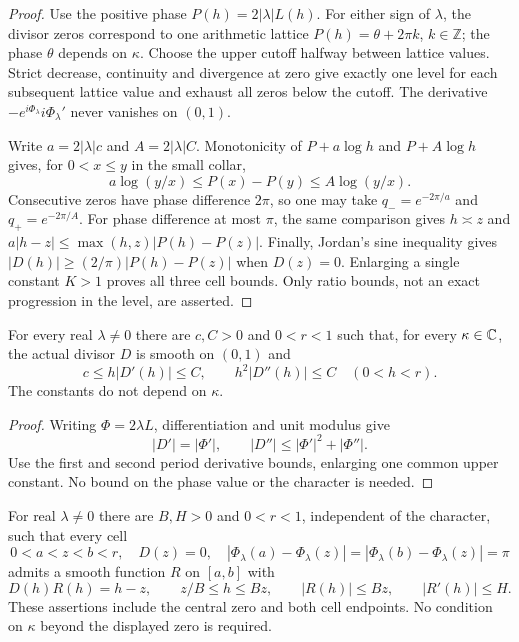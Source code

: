 \begin{proof}
\leanok
Use the positive phase $P(h)=2|\lambda|L(h)$. For either sign of $\lambda$,
the divisor zeros correspond to one arithmetic lattice
$P(h)=\theta+2\pi k$, $k\in\mathbb Z$; the phase $\theta$ depends on $\kappa$.
Choose the upper cutoff halfway between lattice values. Strict decrease,
continuity and divergence at zero give exactly one level for each subsequent
lattice value and exhaust all zeros below the cutoff. The derivative
$-e^{i\Phi_\lambda}i\Phi_\lambda'$ never vanishes on $(0,1)$.

Write $a=2|\lambda|c$ and $A=2|\lambda|C$. Monotonicity of
$P+a\log h$ and $P+A\log h$ gives, for $0<x\le y$ in the small collar,
\[
 a\log(y/x)\le P(x)-P(y)\le A\log(y/x).
\]
Consecutive zeros have phase difference $2\pi$, so one may take
$q_-=e^{-2\pi/a}$ and $q_+=e^{-2\pi/A}$.
For phase difference at most $\pi$, the same comparison gives
$h\asymp z$ and
$a|h-z|\le \max(h,z)|P(h)-P(z)|$.
Finally, Jordan's sine inequality gives
$|D(h)|\ge(2/\pi)|P(h)-P(z)|$ when $D(z)=0$.
Enlarging a single constant $K>1$ proves all three cell bounds.
Only ratio bounds, not an exact progression in the level, are asserted.
\end{proof}

\begin{lemma}
\label{lem:quarter-divisor-derivatives}
\leanok
For every real $\lambda\ne0$ there are $c,C>0$ and $0<r<1$ such that,
for every $\kappa\in\mathbb{C}$, the actual divisor $D$ is smooth on $(0,1)$ and
\[
 c\le h|D'(h)|\le C,\qquad h^2|D''(h)|\le C
 \quad(0<h<r).
\]
The constants do not depend on $\kappa$.
\end{lemma}

\begin{proof}
\leanok
Writing $\Phi=2\lambda L$, differentiation and unit modulus give
\[
 |D'|=|\Phi'|,\qquad |D''|\le|\Phi'|^2+|\Phi''|.
\]
Use the first and second period derivative bounds, enlarging one common
upper constant. No bound on the phase value or the character is needed.
\end{proof}

\begin{lemma}
\label{lem:quarter-divisor-inverse-factor}
\leanok
For real $\lambda\ne0$ there are $B,H>0$ and $0<r<1$, independent of
the character, such that every cell
\[
 0<a<z<b<r,\quad D(z)=0,\quad
 |\Phi_\lambda(a)-\Phi_\lambda(z)|
 =|\Phi_\lambda(b)-\Phi_\lambda(z)|=\pi
\]
admits a smooth function $R$ on $[a,b]$ with
\[
 D(h)R(h)=h-z,\qquad z/B\le h\le Bz,\qquad
 |R(h)|\le Bz,\qquad |R'(h)|\le H .
\]
These assertions include the central zero and both cell endpoints.
No condition on $\kappa$ beyond the displayed zero is required.
\end{lemma}

